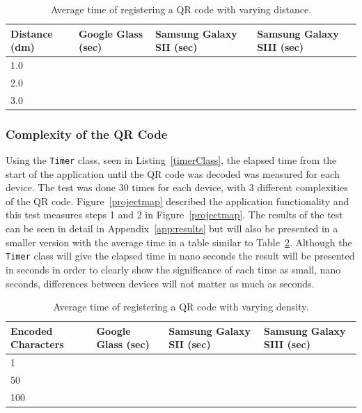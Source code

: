 	\begin{table}[ht!]
    		\caption{Average time of registering a QR code with varying distance.} \label{tab:distanceAverage}
		\centering \begin{tabularx}{\textwidth}{l|X|X|X} \hline
		\textbf{Distance (dm)} & \textbf{Google Glass (sec)} & \textbf{Samsung Galaxy SII (sec)} & \textbf{Samsung Galaxy SIII (sec)} \\ \hline \hline
       
		1.0	&	&	&	\\ \hline
		2.0	&	&	&	\\ \hline
		3.0	&	&	&	\\ \hline
		
		\end{tabularx}
	\end{table}

\subsubsection{Complexity of the QR Code}

Using the \texttt{Timer} class, seen in Listing~\ref{timerClass}, the elapsed time from the start of the application until the QR code was decoded was measured for each device. The test was done 30 times for each device, with 3 different complexities of the QR code. Figure~\ref{projectmap} described the application functionality and this test measures steps 1 and 2 in Figure~\ref{projectmap}. The results of the test can be seen in detail in Appendix~\ref{app:results} but will also be presented in a smaller version with the average time in a table similar to Table~\ref{tab:complexityAverage}. Although the \texttt{Timer} class will give the elapsed time in nano seconds the result will be presented in seconds in order to clearly show the significance of each time as small, nano seconds, differences between devices will not matter as much as seconds.

	\begin{table}[H]%
    		\caption{Average time of registering a QR code with varying density.} \label{tab:complexityAverage}
		\centering \begin{tabularx}{\textwidth}{l|X|X|X} \hline
		\textbf{Encoded Characters} & \textbf{Google Glass (sec)} & \textbf{Samsung Galaxy SII (sec)} & \textbf{Samsung Galaxy SIII (sec)} \\ \hline \hline
       
		1	&	&	&	\\ \hline
		50	&	&	&	\\ \hline
		100	&	&	&	\\ \hline
		
		\end{tabularx}
	\end{table}

